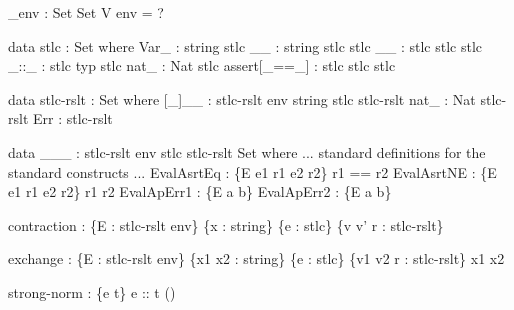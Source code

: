\_env : Set \altRArr Set
V env = ?

data stlc : Set where
  Var\_ : string \altRArr stlc
  \altCdot\altLamb\_\altCdot\_ : string \altRArr stlc \altRArr stlc
  \_\altCirc\_ : stlc \altRArr stlc \altRArr stlc
  \_::\_ : stlc \altRArr typ \altRArr stlc
  nat_ : Nat \altRArr stlc
  assert[\_==\_] : stlc \altRArr stlc \altRArr stlc

data stlc-rslt : Set where
  [\_]\altLamb\_\altCdot\_ : stlc-rslt env \altRArr string \altRArr stlc \altRArr stlc-rslt
  nat_ : Nat \altRArr stlc-rslt
  Err : stlc-rslt

data \_\altVdash\_\altRARR\_ : stlc-rslt env \altRArr stlc \altRArr stlc-rslt \altRArr Set where
  ... standard definitions for the standard constructs ...
  EvalAsrtEq : \altFAll\{E e1 r1 e2 r2\} \altRArr
                  \altRArr
                  \altRArr
                 r1 == r2 \altRArr
  EvalAsrtNE : \altFAll\{E e1 r1 e2 r2\} \altRArr
                  \altRArr
                  \altRArr
                 r1 \altNE r2 \altRArr
  EvalApErr1 : \altFAll\{E a b\} \altRArr {} \altRArr {}
  EvalApErr2 : \altFAll\{E a b\} \altRArr {} \altRArr {}

contraction : \{E : stlc-rslt env\} \{x : string\} \{e : stlc\} \{v v' r : stlc-rslt\} \altRArr
                \altRArr

exchange : \{E : stlc-rslt env\} \{x1 x2 : string\} \{e : stlc\} \{v1 v2 r : stlc-rslt\} \altRArr
            x1 \altNE x2 \altRArr
             \altRArr

strong-norm : \altFAll\{\altGam e t\} \altRArr
                \altGam \altVdash e :: t \altRArr
                 ()
